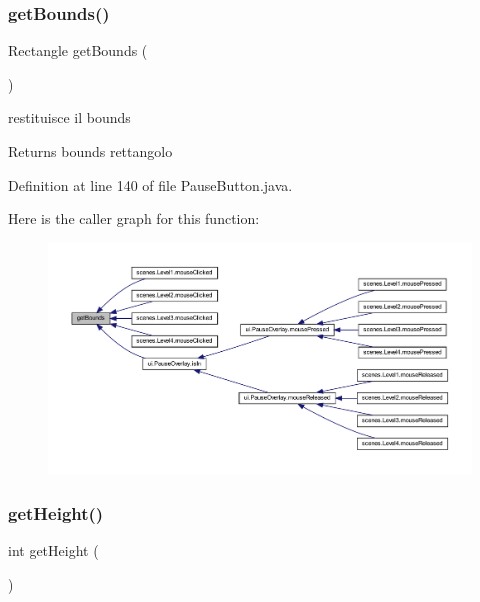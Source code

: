 \subsubsection{\texorpdfstring{get\+Bounds()}{getBounds()}}
{\footnotesize\ttfamily Rectangle get\+Bounds (\begin{DoxyParamCaption}{ }\end{DoxyParamCaption})}



restituisce il bounds 

\begin{DoxyReturn}{Returns}
bounds rettangolo 
\end{DoxyReturn}


Definition at line 140 of file Pause\+Button.\+java.

Here is the caller graph for this function\+:\nopagebreak
\begin{figure}[H]
\begin{center}
\leavevmode
\includegraphics[width=350pt]{classui_1_1_pause_button_a187945475e730bfa340a10f63224e91f_icgraph}
\end{center}
\end{figure}
\mbox{\label{classui_1_1_pause_button_a07efb2a4e9a982688c8bb3c3f21d1092}} 
\subsubsection{\texorpdfstring{get\+Height()}{getHeight()}}
{\footnotesize\ttfamily int get\+Height (\begin{DoxyParamCaption}{ }\end{DoxyParamCaption})}



